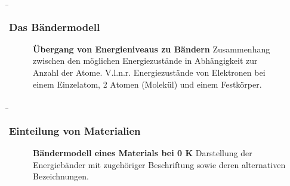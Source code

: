 \begin{frame}
{\begin{columns}
\begin{itemize}
        \end{itemize}
    \end{columns}
}

\end{frame}

\begin{frame}
    \b{
    \frametitle{Das Bändermodell}
    \begin{figure}[H]
        \centering
        
        \caption{\textbf{Übergang von Energieniveaus zu Bändern} Zusammenhang zwischen den möglichen Energiezustände in Abhängigkeit zur Anzahl der Atome. V.l.n.r. Energiezustände von Elektronen bei einem Einzelatom, 2 Atomen (Molekül) und einem Festkörper.}  
    \end{figure}

    }
\end{frame}

\begin{frame}
    \b{
    \frametitle{Einteilung von Materialien}
    \begin{figure}[H]
        \centering
        
        \caption{\textbf{Bändermodell eines Materials bei 0 K} Darstellung der Energiebänder mit zugehöriger Beschriftung sowie deren alternativen Bezeichnungen.}  
    \end{figure}
    }

\end{frame}

